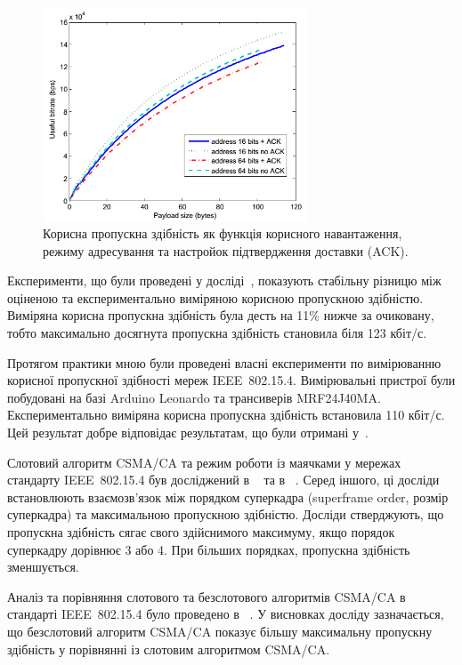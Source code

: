 \documentclass[a4paper,ukrainian,utf8,nocolumnsxix,floatsection,equationsection]{eskdtext}
\newcommand{\todoi}[1]{\todo[inline]{#1}}
\newcommand{\iee}[0]{IEEE~802.15.4\xspace}
\newcommand{\csma}[0]{CSMA/CA\xspace}
\begin{document}
\begin{figure}[bth]
	\centering
	\includegraphics[width=0.7\textwidth]{img/throughput_graph.png}
	\caption{\label{fig:throughput_graph}Корисна пропускна здібність як функція корисного навантаження, режиму адресування та настройок підтвердження доставки (ACK).}
\end{figure}

Експерименти, що були проведені у досліді~\cite{thoroughput:analysis:unslotted:ieee}, показують стабільну різницю між оціненою та експериментально виміряною корисною пропускною здібністю. Виміряна корисна пропускна здібність була десть на 11\% нижче за очиковану, тобто максимально досягнута пропускна здібність становила біля 123 кбіт/с.

Протягом практики мною були проведені власні експерименти по вимірюванню корисної пропускної здібності мереж \iee. Вимірювальні пристрої були побудовані на базі Arduino Leonardo та трансиверів MRF24J40MA. Експериментально виміряна корисна пропускна здібність встановила 110 кбіт/с. Цей результат добре відповідає результатам, що були отримані у~\cite{thoroughput:analysis:unslotted:ieee}.

Слотовий алгоритм \csma та режим роботи із маячками у мережах стандарту \iee був досліджений в ~\cite{simulation:study:slotted:ieee} та в ~\cite{gts:allocation:analysis}. Серед іншого, ці досліди встановлюють взаємозв'язок між порядком суперкадра (superframe order, розмір суперкадра) та максимальною пропускною здібністю. Досліди стверджують, що пропускна здібність сягає свого здійснимого максимуму, якщо порядок суперкадру дорівнює 3 або 4. При більших порядках, пропускна здібність зменшується.

\todoi{fix, не зменьшуеться}

Аналіз та порівняння слотового та безслотового алгоритмів \csma в стандарті \iee було проведено в ~\cite{analysis:slotted:unslotted}. У висновках досліду зазначається, що безслотовий алгоритм \csma  показує більшу максимальну пропускну здібність у порівнянні із слотовим алгоритмом \csma.
\end{document}
